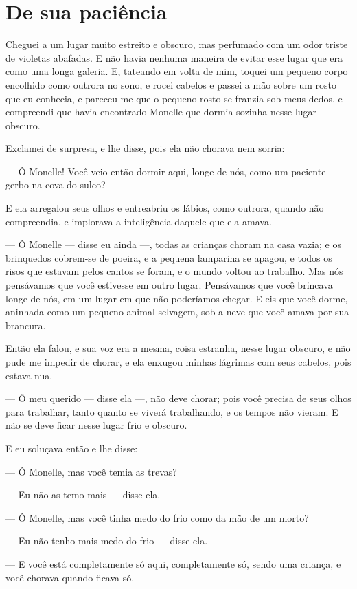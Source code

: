 \section{De sua paciência}

Cheguei a um lugar muito estreito e obscuro, mas perfumado com um odor
triste de violetas abafadas. E não havia nenhuma maneira de evitar esse
lugar que era como uma longa galeria. E, tateando em volta de mim, toquei
um pequeno corpo encolhido como outrora no sono, e rocei cabelos e passei
a mão sobre um rosto que eu conhecia, e pareceu-me que o pequeno rosto se
franzia sob meus dedos, e compreendi que havia encontrado Monelle que
dormia sozinha nesse lugar obscuro.

Exclamei de surpresa, e lhe disse, pois ela não chorava nem sorria:

--- Ô Monelle! Você veio então dormir aqui, longe de nós, como um
paciente gerbo na cova do sulco?

E ela arregalou seus olhos e entreabriu os lábios, como outrora, quando
não compreendia, e implorava a inteligência daquele que ela amava.

--- Ô Monelle --- disse eu ainda ---, todas as crianças choram na casa vazia; e
os brinquedos cobrem-se de poeira, e a pequena lamparina se apagou, e todos
os risos que estavam pelos cantos se foram, e o mundo voltou ao trabalho.
Mas nós pensávamos que você estivesse em outro lugar. Pensávamos que você
brincava longe de nós, em um lugar em que não poderíamos chegar. E eis que
você dorme, aninhada como um pequeno animal selvagem, sob a neve que você
amava por sua brancura.

Então ela falou, e sua voz era a mesma, coisa estranha, nesse lugar
obscuro, e não pude me impedir de chorar, e ela enxugou minhas lágrimas
com seus cabelos, pois estava nua.

--- Ô meu querido --- disse ela ---, não deve chorar; pois você precisa de seus
olhos para trabalhar, tanto quanto se viverá trabalhando, e os tempos não
vieram. E não se deve ficar nesse lugar frio e obscuro.

E eu soluçava então e lhe disse:

--- Ô Monelle, mas você temia as trevas?

--- Eu não as temo mais --- disse ela.

--- Ô Monelle, mas você tinha medo do frio como da mão de um morto?

--- Eu não tenho mais medo do frio --- disse ela.

--- E você está completamente só aqui, completamente só, sendo uma
criança, e você chorava quando ficava só.

